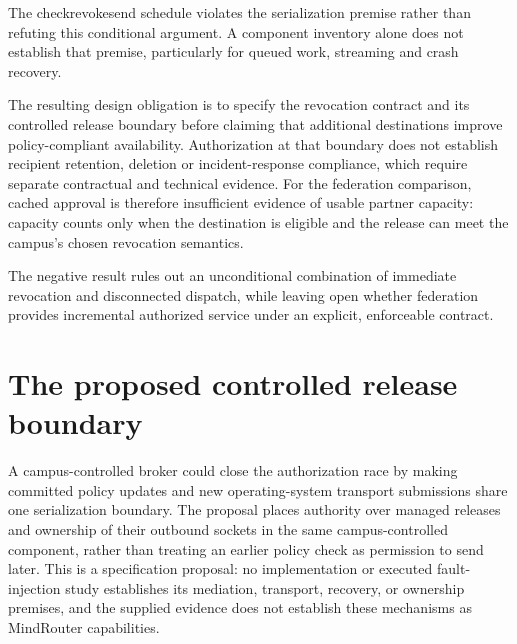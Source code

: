 \documentclass[11pt]{article}
\begin{document}
The check\textendash{}\allowbreak{}revoke\textendash{}\allowbreak{}send schedule violates the serialization premise rather than refuting this conditional argument. A component inventory alone does not establish that premise, particularly for queued work, streaming and crash recovery.

The resulting design obligation is to specify the revocation contract and its controlled release boundary before claiming that additional destinations improve policy-compliant availability. Authorization at that boundary does not establish recipient retention, deletion or incident-response compliance, which require separate contractual and technical evidence. For the federation comparison, cached approval is therefore insufficient evidence of usable partner capacity: capacity counts only when the destination is eligible and the release can meet the campus's chosen revocation semantics.

The negative result rules out an unconditional combination of immediate revocation and disconnected dispatch, while leaving open whether federation provides incremental authorized service under an explicit, enforceable contract.

\section{The proposed controlled release boundary}
A campus-controlled broker could close the authorization race by making committed policy updates and new operating-system transport submissions share one serialization boundary. The proposal places authority over managed releases and ownership of their outbound sockets in the same campus-controlled component, rather than treating an earlier policy check as permission to send later. This is a specification proposal: no implementation or executed fault-injection study establishes its mediation, transport, recovery, or ownership premises, and the supplied evidence does not establish these mechanisms as MindRouter capabilities.
\end{document}
